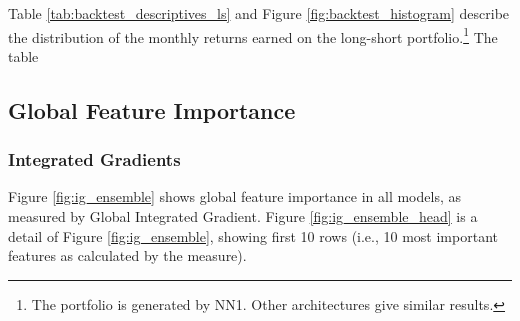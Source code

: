 		Table \ref{tab:backtest_descriptives_ls} and Figure \ref{fig:backtest_histogram} describe the distribution of the monthly returns earned on the long-short portfolio.\footnote{The portfolio is generated by NN1. Other architectures give similar results.} The table 
		
	\subsection{Global Feature Importance}
	
		\subsubsection{Integrated Gradients}
	
		Figure \ref{fig:ig_ensemble} shows global feature importance in all models, as measured by Global Integrated Gradient. Figure \ref{fig:ig_ensemble_head} is a detail of Figure \ref{fig:ig_ensemble}, showing first 10 rows (i.e., 10 most important features as calculated by the measure). 
		
